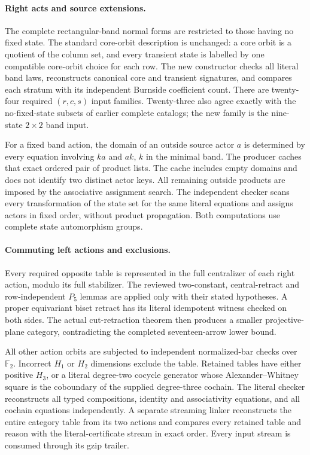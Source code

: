 \paragraph{Right acts and source extensions.}
The complete rectangular-band normal forms are restricted
to those having no fixed state.  The standard core-orbit
description is unchanged: a core orbit is a quotient of
the column set, and every transient state is labelled by
one compatible core-orbit choice for each row.  The new
constructor checks all literal band laws, reconstructs
canonical core and transient signatures, and compares each
stratum with its independent Burnside coefficient count.
There are twenty-four required $(r,c,s)$ input families.
Twenty-three also agree exactly with the no-fixed-state
subsets of earlier complete catalogs; the new family is
the nine-state $2\times2$ band input.

For a fixed band action, the domain of an outside source
actor $a$ is determined by every equation involving
$ka$ and $ak$, $k$ in the minimal band.  The producer
caches that exact ordered pair of product lists.  The
cache includes empty domains and does not identify two
distinct actor keys.  All remaining outside products
are imposed by the associative assignment search.  The
independent checker scans every transformation of the
state set for the same literal equations and assigns
actors in fixed order, without product propagation.
Both computations use complete state automorphism groups.

\paragraph{Commuting left actions and exclusions.}
Every required opposite table is represented in the full
centralizer of each right action, modulo its full
stabilizer.  The reviewed two-constant, central-retract
and row-independent $P_5$ lemmas are applied only with
their stated hypotheses.  A proper equivariant biset
retract has its literal idempotent witness checked on
both sides.  The actual cut-retraction theorem then
produces a smaller projective-plane category, contradicting
the completed seventeen-arrow lower bound.

All other action orbits are subjected to independent
normalized-bar checks over $\mathbb F_2$.  Incorrect
$H_1$ or $H_2$ dimensions exclude the table.  Retained
tables have either positive $H_3$, or a literal degree-two
cocycle generator whose Alexander--Whitney square is
the coboundary of the supplied degree-three cochain.
The literal checker reconstructs all typed compositions,
identity and associativity equations, and all cochain
equations independently.  A separate streaming linker
reconstructs the entire category table from its two
actions and compares every retained table and reason
with the literal-certificate stream in exact order.
Every input stream is consumed through its gzip trailer.


